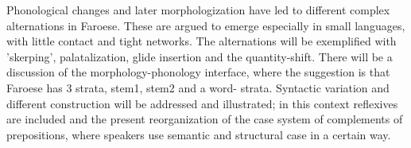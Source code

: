 Phonological changes and later morphologization have led to different complex alternations in Faroese. These are argued to emerge especially in small languages, with little contact and tight networks. The alternations will be exemplified with 'skerping', palatalization, glide insertion and the quantity-shift. There will be a discussion of the morphology-phonology interface, where the suggestion is that Faroese has 3 strata, stem1, stem2 and a word- strata. Syntactic variation and different construction will be addressed and illustrated; in this context reflexives are included and the present reorganization of the case system of complements of prepositions, where speakers use semantic and structural case in a certain way. 

